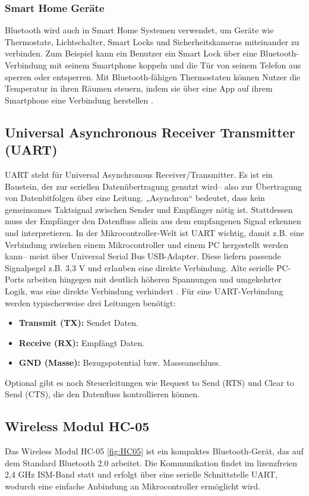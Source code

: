 \subsubsection{Smart Home Geräte}
Bluetooth wird auch in Smart Home Systemen verwendet, um Geräte wie Thermostate, Lichtschalter, Smart Locks und Sicherheitskameras miteinander zu verbinden. Zum Beispiel kann ein Benutzer ein Smart Lock über eine Bluetooth-Verbindung mit seinem Smartphone koppeln und die Tür von seinem Telefon aus sperren oder entsperren. Mit Bluetooth-fähigen Thermostaten können Nutzer die Temperatur in ihren Räumen steuern, indem sie über eine App auf ihrem Smartphone eine Verbindung herstellen \cite{Gaum:2023}.

\subsection{Universal Asynchronous Receiver Transmitter (UART)}
UART steht für Universal Asynchronous Receiver/Transmitter. Es ist ein Baustein, der zur seriellen Datenübertragung genutzt wird– also zur Übertragung von Datenbitfolgen über eine Leitung. „Asynchron“ bedeutet, dass kein gemeinsames Taktsignal zwischen Sender und Empfänger nötig ist. Stattdessen muss der Empfänger den Datenfluss allein aus dem empfangenen Signal erkennen und interpretieren. In der Mikrocontroller-Welt ist UART wichtig, damit z.B. eine Verbindung zwischen einem Mikrocontroller und einem PC hergestellt werden kann– meist über Universal Serial Bus USB-Adapter. Diese liefern passende Signalpegel z.B. 3,3 V und erlauben eine direkte Verbindung. Alte serielle PC-Ports arbeiten hingegen mit deutlich höheren Spannungen und umgekehrter Logik, was eine direkte Verbindung verhindert \cite{Gehrke:2022}. Für eine UART-Verbindung werden typischerweise drei Leitungen benötigt:
\begin{itemize}
	\item \textbf{Transmit (TX):} Sendet Daten.
	\item \textbf{Receive (RX):} Empfängt Daten.
	\item \textbf{GND (Masse):} Bezugspotential bzw. Masseanschluss.
\end{itemize} 

Optional gibt es noch Steuerleitungen wie Request to Send (RTS) und Clear to Send (CTS), die den Datenfluss kontrollieren können. \cite{Gehrke:2022}

\subsection{Wireless Modul HC-05}
Das Wireless Modul HC-05 \ref{fig:HC05} ist ein kompaktes Bluetooth-Gerät, das auf dem Standard Bluetooth 2.0 arbeitet. Die Kommunikation findet im lizenzfreien 2,4 GHz ISM-Band statt und erfolgt über eine serielle Schnittstelle UART, wodurch eine einfache Anbindung an Mikrocontroller ermöglicht wird.


